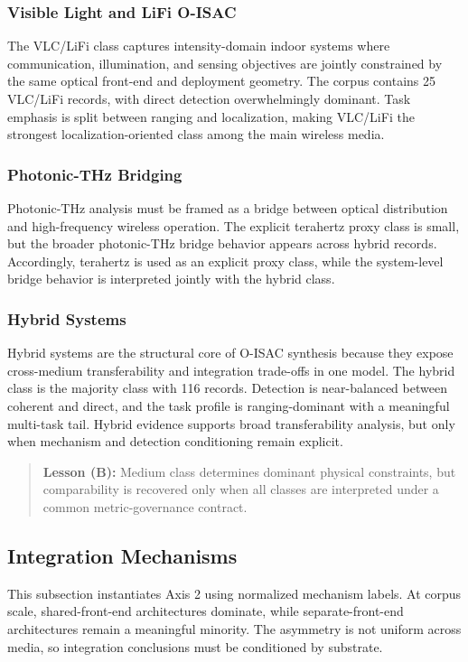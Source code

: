 \subsubsection{Visible Light and LiFi O-ISAC}
The VLC/LiFi class captures intensity-domain indoor systems where communication, illumination, and sensing objectives are jointly constrained by the same optical front-end and deployment geometry. The corpus contains 25 VLC/LiFi records, with direct detection overwhelmingly dominant. Task emphasis is split between ranging and localization, making VLC/LiFi the strongest localization-oriented class among the main wireless media.

\subsubsection{Photonic-THz Bridging}
Photonic-THz analysis must be framed as a bridge between optical distribution and high-frequency wireless operation. The explicit terahertz proxy class is small, but the broader photonic-THz bridge behavior appears across hybrid records. Accordingly, terahertz is used as an explicit proxy class, while the system-level bridge behavior is interpreted jointly with the hybrid class.

\subsubsection{Hybrid Systems}
Hybrid systems are the structural core of O-ISAC synthesis because they expose cross-medium transferability and integration trade-offs in one model. The hybrid class is the majority class with 116 records. Detection is near-balanced between coherent and direct, and the task profile is ranging-dominant with a meaningful multi-task tail. Hybrid evidence supports broad transferability analysis, but only when mechanism and detection conditioning remain explicit.

\begin{quote}
\textbf{Lesson (B):} Medium class determines dominant physical constraints, but comparability is recovered only when all classes are interpreted under a common metric-governance contract.
\end{quote}

\subsection{Integration Mechanisms}
This subsection instantiates Axis 2 using normalized mechanism labels. At corpus scale, shared-front-end architectures dominate, while separate-front-end architectures remain a meaningful minority. The asymmetry is not uniform across media, so integration conclusions must be conditioned by substrate.

